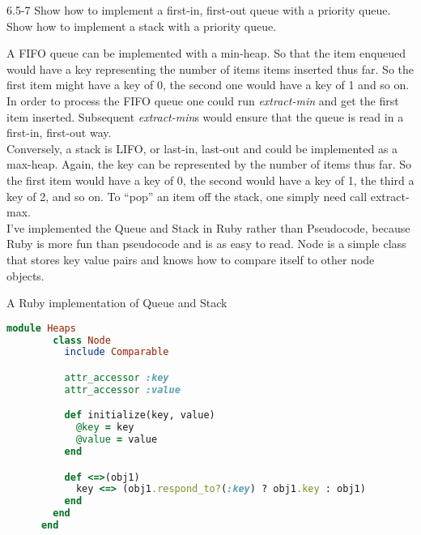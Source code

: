 

\usepackage{listings}




\homeworkheader{\classnameandsection}

\begin{problem}{6.5-7}
  Show how to implement a first-in, first-out queue with a priority queue. Show how to implement a stack with
  a priority queue.

  \begin{solution}
    A FIFO queue can be implemented with a min-heap. So that the item enqueued would have a key representing
    the number of items items inserted thus far. So the first item might have a key of 0, the second one would have a key
    of 1 and so on. \\

    In order to process the FIFO queue one could run {\sl extract-min} and get the first item inserted.
    Subsequent {\sl extract-min}s would ensure that the queue is read in a first-in, first-out way. \\

    Conversely, a stack is LIFO, or last-in, last-out and could be implemented as a max-heap.
    Again, the key can be represented by the number of items thus far. So the first item would have a key of 0, the second
    would have a key of 1, the third a key of 2, and so on. To ``pop'' an item off the stack, one simply need
    call extract-max. \\

    I've implemented the Queue and Stack in Ruby rather than Pseudocode, because Ruby is more fun than pseudocode and
    is as easy to read. Node is a simple class that stores key value pairs and knows how to compare itself to other
    node objects. \\

    \centerline{A Ruby implementation of Queue and Stack}
    \begin{lstlisting}[language=Ruby]
      module Heaps
        class Node
          include Comparable

          attr_accessor :key
          attr_accessor :value

          def initialize(key, value)
            @key = key
            @value = value
          end

          def <=>(obj1)
            key <=> (obj1.respond_to?(:key) ? obj1.key : obj1)
          end
        end
      end


\end{lstlisting}
\end{solution}
\end{problem}
